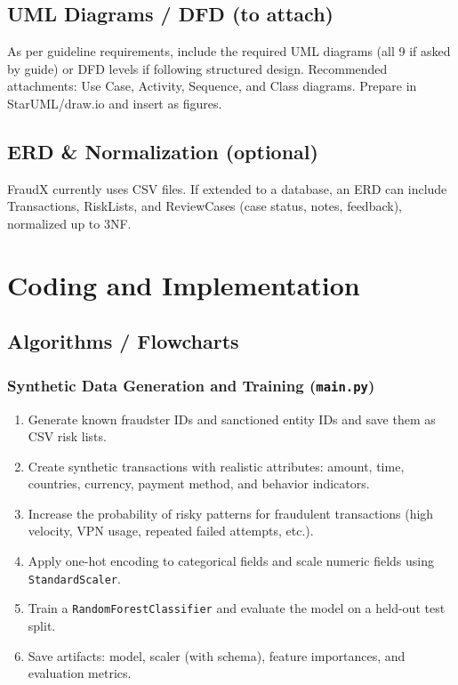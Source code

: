 \documentclass[12pt,a4paper]{report}
\begin{document}
\section{UML Diagrams / DFD (to attach)}
As per guideline requirements, include the required UML diagrams (all 9 if asked by guide) or DFD levels if following structured design. Recommended attachments: Use Case, Activity, Sequence, and Class diagrams. Prepare in StarUML/draw.io and insert as figures.

\section{ERD \& Normalization (optional)}
FraudX currently uses CSV files. If extended to a database, an ERD can include Transactions, RiskLists, and ReviewCases (case status, notes, feedback), normalized up to 3NF.

\chapter{Coding and Implementation}
\section{Algorithms / Flowcharts}
\subsection{Synthetic Data Generation and Training (\texttt{main.py})}
\begin{enumerate}
  \item Generate known fraudster IDs and sanctioned entity IDs and save them as CSV risk lists.
  \item Create synthetic transactions with realistic attributes: amount, time, countries, currency, payment method, and behavior indicators.
  \item Increase the probability of risky patterns for fraudulent transactions (high velocity, VPN usage, repeated failed attempts, etc.).
  \item Apply one-hot encoding to categorical fields and scale numeric fields using \texttt{StandardScaler}.
  \item Train a \texttt{RandomForestClassifier} and evaluate the model on a held-out test split.
  \item Save artifacts: model, scaler (with schema), feature importances, and evaluation metrics.
\end{enumerate}
\end{document}
